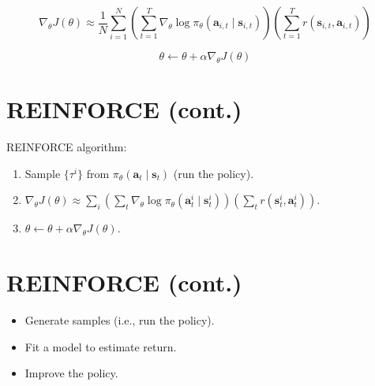 \documentclass{article}
\begin{document}
\begin{equation}
\nabla_{\theta} J(\theta) \approx \frac{1}{N} \sum_{i=1}^{N} \left( \sum_{t=1}^{T} \nabla_{\theta} \log \pi_{\theta}(\mathbf{a}_{i, t} \mid \mathbf{s}_{i, t}) \right) \left( \sum_{t=1}^{T} r(\mathbf{s}_{i, t}, \mathbf{a}_{i, t}) \right)
\end{equation}

\begin{equation}
\theta \leftarrow \theta + \alpha \nabla_{\theta} J(\theta)
\end{equation}

\section*{REINFORCE (cont.)}

REINFORCE algorithm:

\begin{enumerate}
    \item Sample \(\{\tau^{i}\}\) from \(\pi_{\theta}(\mathbf{a}_{t} \mid \mathbf{s}_{t})\) (run the policy).
    \item \(\nabla_{\theta} J(\theta) \approx \sum_{i} \left( \sum_{t} \nabla_{\theta} \log \pi_{\theta}(\mathbf{a}_{t}^{i} \mid \mathbf{s}_{t}^{i}) \right) \left( \sum_{t} r(\mathbf{s}_{t}^{i}, \mathbf{a}_{t}^{i}) \right)\).
    \item \(\theta \leftarrow \theta + \alpha \nabla_{\theta} J(\theta)\).
\end{enumerate}

\section*{REINFORCE (cont.)}

\begin{itemize}
    \item Generate samples (i.e., run the policy).
    \item Fit a model to estimate return.
    \item Improve the policy.
\end{itemize}
\end{document}
